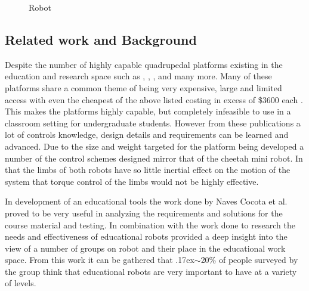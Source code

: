 \documentclass[conference]{IEEEtran}
\newcommand{\approximately}{{\raise.17ex\hbox{$\scriptstyle\mathtt{\sim}$}}}
\newcommand*{\ClipSep}{0.2cm}%
\begin{document}
\begin{figure}[t]
	\centering
  	\caption{Robot}
	\label{fig:FinalRobot}
\end{figure}
\subsection{Related work and Background}
Despite the number of highly capable quadrupedal platforms existing in the education and research space such as \cite{8593885}, \cite{HyQ}, \cite{8793865}, \cite{8813480} and many more. Many of these platforms share a common theme of being very expensive, large and limited access with even the cheapest of the above listed costing in excess of \$3600 each \cite{8793865}. This makes the platforms highly capable, but completely infeasible to use in a classroom setting for undergraduate students. However from these publications a lot of controls knowledge, design details and requirements can be learned and advanced. Due to the size and weight targeted for the platform being developed a number of the control schemes designed mirror that of the cheetah mini robot\cite{8793865}. In that the limbs of both robots have so little inertial effect on the motion of the system that torque control of the limbs would not be highly effective. 

In development of an educational tools the work done by Naves Cocota et al.\cite{6900173} proved to be very useful in analyzing the requirements and solutions for the course material and testing. In combination with the work done to research the needs and effectiveness of educational robots \cite{8001854} provided a deep insight into the view of a number of groups on robot and their place in the educational work space. From this work it can be gathered that \approximately20\% of people surveyed by the group think that educational robots are very important to have at a variety of levels.
\end{document}
